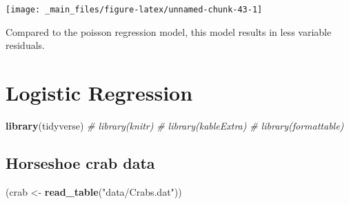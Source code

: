 \documentclass[]{book}
\newenvironment{Shaded}{\begin{snugshade}}{\end{snugshade}}
\newcommand{\CommentTok}[1]{\textcolor[rgb]{0.56,0.35,0.01}{\textit{#1}}}
\newcommand{\DataTypeTok}[1]{\textcolor[rgb]{0.13,0.29,0.53}{#1}}
\newcommand{\DecValTok}[1]{\textcolor[rgb]{0.00,0.00,0.81}{#1}}
\newcommand{\FloatTok}[1]{\textcolor[rgb]{0.00,0.00,0.81}{#1}}
\newcommand{\KeywordTok}[1]{\textcolor[rgb]{0.13,0.29,0.53}{\textbf{#1}}}
\newcommand{\NormalTok}[1]{#1}
\newcommand{\OperatorTok}[1]{\textcolor[rgb]{0.81,0.36,0.00}{\textbf{#1}}}
\newcommand{\StringTok}[1]{\textcolor[rgb]{0.31,0.60,0.02}{#1}}
\begin{document}
\begin{Shaded}
\end{Shaded}

\begin{center}\texttt{[image: \_main\_files/figure-latex/unnamed-chunk-43-1]} \end{center}

Compared to the poisson regression model, this model results in less variable residuals.

\hypertarget{logistic-regression}{%
\chapter{Logistic Regression}\label{logistic-regression}}

\begin{Shaded}
\begin{Highlighting}[]
\KeywordTok{library}\NormalTok{(tidyverse)}
\CommentTok{# library(knitr)}
\CommentTok{# library(kableExtra)}
\CommentTok{# library(formattable)}
\end{Highlighting}
\end{Shaded}

\hypertarget{horseshoe-crab-data}{%
\section{Horseshoe crab data}\label{horseshoe-crab-data}}

\begin{Shaded}
\begin{Highlighting}[]
\NormalTok{(crab <-}\StringTok{ }\KeywordTok{read_table}\NormalTok{(}\StringTok{"data/Crabs.dat"}\NormalTok{))}
\end{Highlighting}
\end{Shaded}
\end{document}
